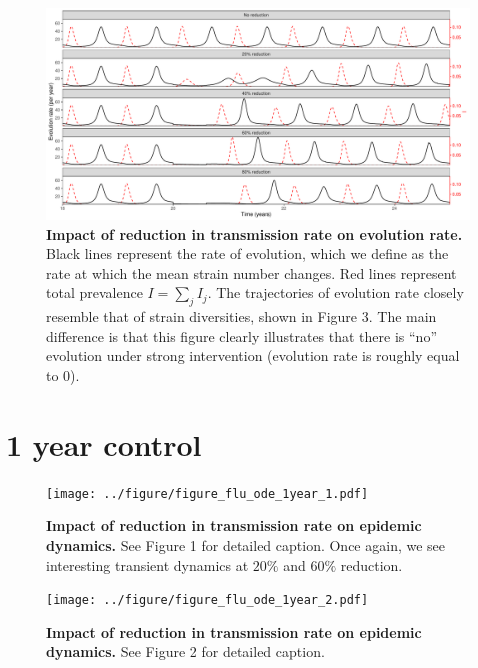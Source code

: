 \documentclass[12pt]{article}
\begin{document}
\begin{figure}[!h]
\includegraphics[width=\textwidth]{../figure/figure_flu_ode_6month_5.pdf}
\caption{
\textbf{Impact of reduction in transmission rate on evolution rate.}
Black lines represent the rate of evolution, which we define as the rate at which the mean strain number changes.
Red lines represent total prevalence $I = \sum_j I_j$.
The trajectories of evolution rate closely resemble that of strain diversities, shown in Figure 3.
The main difference is that this figure clearly illustrates that there is ``no'' evolution under strong intervention (evolution rate is roughly equal to 0).
}
\end{figure}


\pagebreak

\section{1 year control}

\begin{figure}[!h]
\texttt{[image: ../figure/figure\_flu\_ode\_1year\_1.pdf]}
\caption{
\textbf{Impact of reduction in transmission rate on epidemic dynamics.}
See Figure 1 for detailed caption.
Once again, we see interesting transient dynamics at $20\%$ and $60\%$ reduction.
}
\end{figure}

\pagebreak

\begin{figure}[!h]
\texttt{[image: ../figure/figure\_flu\_ode\_1year\_2.pdf]}
\caption{
\textbf{Impact of reduction in transmission rate on epidemic dynamics.}
See Figure 2 for detailed caption.
}
\end{figure}

\pagebreak
\end{document}
